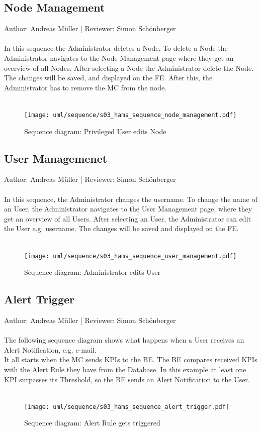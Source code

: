 \documentclass{scrreprt}
\begin{document}
\subsection{Node Management}
Author:  Andreas M\"uller |
Reviewer: Simon Sch\"onberger\\ \\
In this sequence the Administrator deletes a Node.
To delete a Node the Administrator navigates to the Node Management page where they get an overview of all Nodes. After selecting a Node the Administrator delete the Node.
The changes will be saved, and displayed on the FE.
After this, the Administrator has to remove the MC from the node.
\\ \\
\begin{figure}[h]
	\centering
	\texttt{[image: uml/sequence/s03\_hams\_sequence\_node\_management.pdf]}
	\caption{Sequence diagram: Privileged User edits Node}
	\label{editUserSequence}
\end{figure}
\pagebreak
\subsection{User Managemenet}
Author:  Andreas M\"uller |
Reviewer: Simon Sch\"onberger\\ \\
In this sequence, the Administrator changes the username. 
To change the name of an User, the Administrator navigates to the User Management page, where they get an overview of all Users. After selecting an User, the Administrator can edit the User e.g. username.
The changes will be saved and displayed on the FE.
\\ \\
\begin{figure}[h]
	\centering
	\texttt{[image: uml/sequence/s03\_hams\_sequence\_user\_management.pdf]}
	\caption{Sequence diagram: Administrator edits User}
	\label{editNodeSequence}
\end{figure}
\pagebreak
\subsection{Alert Trigger}
Author:  Andreas M\"uller |
Reviewer: Simon Sch\"onberger\\ \\
The following sequence diagram shows what happens when a User receives an Alert Notification, e.g. e-mail. \\
It all starts when the MC sends KPIs to the BE. The BE compares received KPIs with the Alert Rule they have from the Database.
In this example at least one KPI surpasses its Threshold, so the BE sends an Alert Notification to the User.
\\ \\
\begin{figure}[h]
	\centering
	\texttt{[image: uml/sequence/s03\_hams\_sequence\_alert\_trigger.pdf]}
	\caption{Sequence diagram: Alert Rule gets triggered}
	\label{alertTriggerSequence}
\end{figure}
\pagebreak
\end{document}
